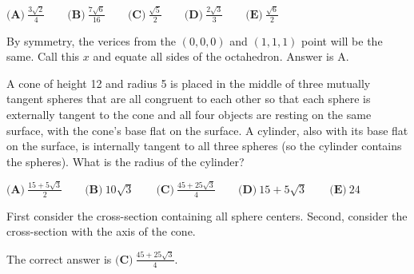 \documentclass[11pt,twoside]{scrartcl}
\begin{document}
\begin{problem}[2012 AMC 12 B, \#19]
\begin{center}
\begin{asy}
        \end{asy}
    \end{center}
    
    $\textbf{(A)}\ \frac{3\sqrt{2}}{4}\qquad\textbf{(B)}\ \frac{7\sqrt{6}}{16}\qquad\textbf{(C)}\ \frac{\sqrt{5}}{2}\qquad\textbf{(D)}\ \frac{2\sqrt{3}}{3}\qquad\textbf{(E)}\ \frac{\sqrt{6}}{2}$
    
    \begin{sketch}
        By symmetry, the verices from the $(0,0,0)$ and $(1,1,1)$ point will be the same. Call this $x$ and equate all sides of the octahedron. Answer is $\boxed{\text{A}}.$
    \end{sketch}
\end{problem}

\begin{problem}
    A cone of height 12 and radius 5 is placed in the middle of three mutually tangent spheres that are all congruent to each other so that each sphere is externally tangent to the cone and all four objects are resting on the same surface, with the cone’s base flat on the surface. A cylinder, also with its base flat on the surface, is internally tangent to all three spheres (so the cylinder contains the spheres). What is the radius of the cylinder? 

    $\textbf{(A)}\ \frac{15+5\sqrt 3}{2}\qquad\textbf{(B)}\ 10\sqrt 3\qquad\textbf{(C)}\ \frac{45+25\sqrt 3}{4}\qquad\textbf{(D)}\ 15 + 5\sqrt 3\qquad\textbf{(E)}\ 24$

    \begin{sketch}
        First consider the cross-section containing all sphere centers. Second, consider the cross-section with the axis of the cone.

        The correct answer is $\boxed{\textbf{(C)}\ \frac{45+25\sqrt 3}{4}}.$
    \end{sketch}
    
\end{problem}
\end{document}
